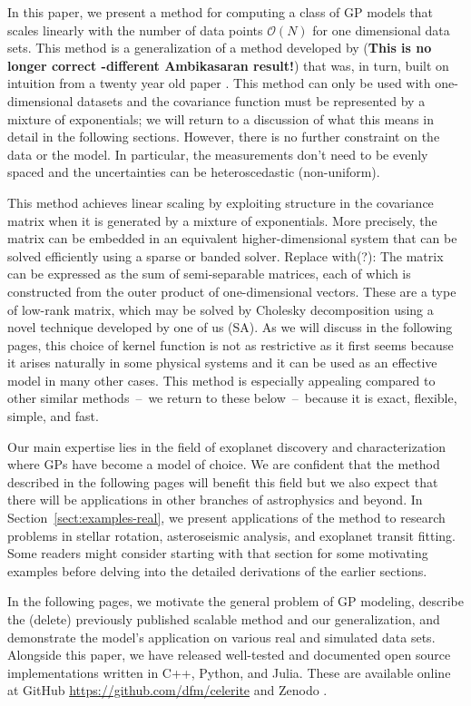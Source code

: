 \documentclass[manuscript, letterpaper]{aastex6}
\newcommand{\project}[1]{\textsf{#1}}
\newcommand{\sectionname}{Section}
\newcommand{\sectref}[1]{\ref{sect:#1}}
\newcommand{\Sect}[1]{\sectionname~\sectref{#1}}
\newcommand{\sect}[1]{\Sect{#1}}
\newcommand{\response}[1]{{\color{blue}#1}}
\begin{document}
In this paper, we present a method for computing a class of GP models that
scales linearly with the number of data points $\mathcal{O}(N)$ for one
dimensional data sets.
\response{This method is a generalization of a method developed by
\citet{Ambikasaran:2015}
 ({\bf This is no longer correct -different Ambikasaran result!})}
that was, in turn, built on intuition from a twenty
year old paper \citep{Rybicki:1995}.
This method can only be used with one-dimensional datasets and the covariance
function must be represented by a mixture of exponentials; we will return to a
discussion of what this means in detail in the following sections.
However, there is no further constraint on the data or the model.
In particular, the measurements don't need to be evenly spaced and the
uncertainties can be heteroscedastic (non-uniform).

This method achieves linear scaling by exploiting structure in the covariance
matrix when it is generated by a mixture of exponentials.
\response{More precisely, the matrix can be embedded in an equivalent higher-dimensional
system that can be solved efficiently using a sparse or banded solver. Replace
with(?): The matrix can be expressed as the sum of semi-separable matrices, each
of which is constructed from the outer product of one-dimensional vectors.  These
are a type of low-rank matrix, which may be solved by Cholesky decomposition
using a novel technique developed by one of us (SA).}
As we will discuss in the following pages, this choice of kernel function is
not as restrictive as it first seems because it arises naturally in some
physical systems and it can be used as an effective model in many other cases.
This method is especially appealing compared to other similar methods~--~we
return to these below~--~because it is exact, flexible, simple, and fast.

Our main expertise lies in the field of exoplanet discovery and
characterization where GPs have become a model of choice.
We are confident that the method described in the following pages will benefit
this field but we also expect that there will be applications in other
branches of astrophysics and beyond.
In \sect{examples-real}, we present applications of the method to research
problems in stellar rotation, asteroseismic analysis, and exoplanet transit
fitting.
Some readers might consider starting with that section for some motivating
examples before delving into the detailed derivations of the earlier sections.

In the following pages, we motivate the general problem of GP modeling,
describe the \response{(delete) previously published} scalable method
\citep{Rybicki:1995, Ambikasaran:2015} and our generalization, and demonstrate
the model's application on various real and simulated data sets.
Alongside this paper, we have released well-tested and documented open source
implementations written in \project{C++}, \project{Python}, and
\project{Julia}.
These are available online at \project{GitHub}
\url{https://github.com/dfm/celerite} and \project{Zenodo}
\citep{Foreman-Mackey:2017}.
\end{document}
